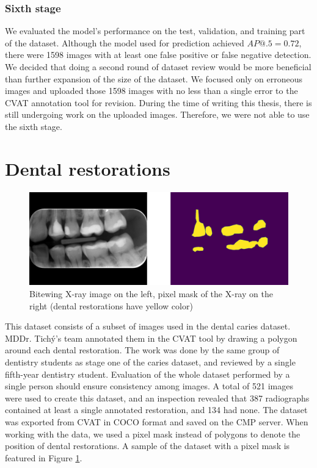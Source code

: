 \subsubsection{Sixth stage}
\label{sec:dataset:sixth_stage}
We evaluated the model's performance on the test, validation, and training part of the dataset. Although the model used for prediction achieved $AP@.5 = 0.72$, there were 1598 images with at least one false positive or false negative detection. We decided that doing a second round of dataset review would be more beneficial than further expansion of the size of the dataset. We focused only on erroneous images and uploaded those 1598 images with no less than a single error to the CVAT annotation tool for revision. During the time of writing this thesis, there is still undergoing work on the uploaded images. Therefore, we were not able to use the sixth stage.


\section{Dental restorations}
\label{sec:dataset:dental_rotorations}
\begin{figure}
    \centering
    \includegraphics[width=\linewidth]{images/segmentation_ds_sample.pdf}
    \caption{Bitewing X-ray image on the left, pixel mask of the X-ray on the right (dental restorations have yellow color)}
    \label{fig:segmentation_sample}
\end{figure}
This dataset consists of a subset of images used in the dental caries dataset. MDDr. Tichý's team annotated them in the CVAT tool by drawing a polygon around each dental restoration. The work was done by the same group of dentistry students as stage one of the caries dataset, and reviewed by a single fifth-year dentistry student. Evaluation of the whole dataset performed by a single person should ensure consistency among images. A total of 521 images were used to create this dataset, and an inspection revealed that 387 radiographs contained at least a single annotated restoration, and 134 had none.
The dataset was exported from CVAT in COCO format and saved on the CMP server. When working with the data, we used a pixel mask instead of polygons to denote the position of dental restorations. A sample of the dataset with a pixel mask is featured in Figure \ref{fig:segmentation_sample}.

